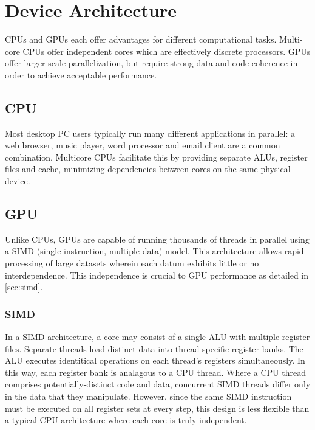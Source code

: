 \chapter{Device Architecture} \label{ch:device architecture}

CPUs and GPUs each offer advantages for different computational tasks. Multi-core CPUs offer independent cores which are effectively discrete processors. GPUs offer larger-scale parallelization, but require strong data and code coherence in order to achieve acceptable performance.

\section{CPU}

Most desktop PC users typically run many different applications in parallel: a web browser, music player, word processor and email client are a common combination. Multicore CPUs facilitate this by providing separate ALUs, register files and cache, minimizing dependencies between cores on the same physical device. 

\section{GPU}

Unlike CPUs, GPUs are capable of running thousands of threads in parallel using a SIMD (single-instruction, multiple-data) model. This architecture allows rapid processing of large datasets wherein each datum exhibits little or no interdependence.  This independence is crucial to GPU performance as detailed in \autoref{sec:simd}.

\subsection{SIMD}\label{sec:simd}

In a SIMD\cite{Massingill:2007:SAP:1772070.1772078} architecture, a core may consist of a single ALU with multiple register files. Separate threads load distinct data into thread-specific register banks. The ALU executes identitical operations on each thread's registers simultaneously. In this way, each register bank is analagous to a CPU thread. Where a CPU thread comprises potentially-distinct code and data, concurrent SIMD threads differ only in the data that they manipulate.  However, since the same SIMD instruction must be executed on all register sets at every step, this design is less flexible than a typical CPU architecture where each core is truly independent. 

